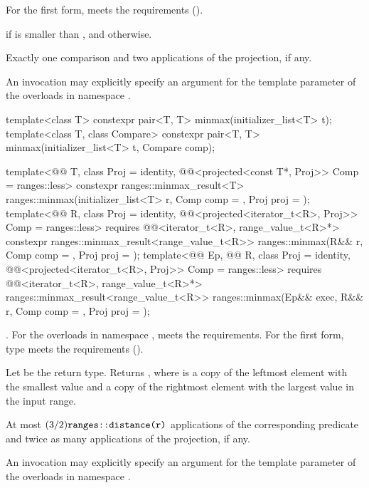 \begin{itemdescr}
\pnum
\expects
For the first form,  meets the
 requirements ().

\pnum
\returns
{} if  is smaller than , and
 otherwise.

\pnum
\complexity
Exactly one comparison and two applications of the projection, if any.

\pnum
\remarks
An invocation may explicitly specify
an argument for the template parameter 
of the overloads in namespace .
\end{itemdescr}

%
\begin{itemdecl}
template<class T>
  constexpr pair<T, T> minmax(initializer_list<T> t);
template<class T, class Compare>
  constexpr pair<T, T> minmax(initializer_list<T> t, Compare comp);

template<@@ T, class Proj = identity,
         @@<projected<const T*, Proj>> Comp = ranges::less>
  constexpr ranges::minmax_result<T>
    ranges::minmax(initializer_list<T> r, Comp comp = {}, Proj proj = {});
template<@@ R, class Proj = identity,
         @@<projected<iterator_t<R>, Proj>> Comp = ranges::less>
  requires @@<iterator_t<R>, range_value_t<R>*>
  constexpr ranges::minmax_result<range_value_t<R>>
    ranges::minmax(R&& r, Comp comp = {}, Proj proj = {});
template<@@ Ep, @@ R, class Proj = identity,
         @@<projected<iterator_t<R>, Proj>> Comp = ranges::less>
  requires @@<iterator_t<R>, range_value_t<R>*>
  ranges::minmax_result<range_value_t<R>>
    ranges::minmax(Ep&& exec, R&& r, Comp comp = {}, Proj proj = {});
\end{itemdecl}

\begin{itemdescr}
\pnum
\expects
{}.
For the overloads in namespace ,
 meets the  requirements.
For the first form, type  meets the 
requirements ().

\pnum
\returns
Let  be the return type.
Returns ,
where  is a copy of the leftmost element with the smallest value and
 a copy of the rightmost element with the largest value
in the input range.

\pnum
\complexity
At most $(3/2)\tcode{ranges::distance(r)}$ applications
of the corresponding predicate
and twice as many applications of the projection, if any.

\pnum
\remarks
An invocation may explicitly specify
an argument for the template parameter 
of the overloads in namespace .
\end{itemdescr}

